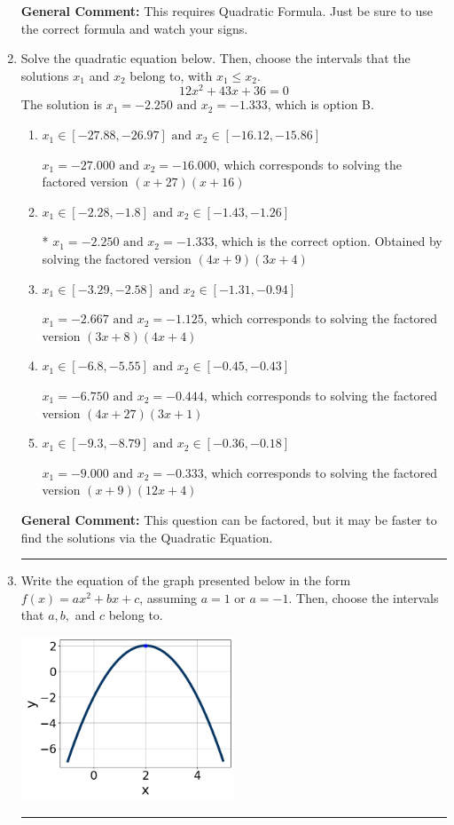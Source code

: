 \documentclass{extbook}[14pt]
\newcommand{\litem}[1]{\item #1

\rule{\textwidth}{0.4pt}}
\begin{document}
\begin{enumerate}
{\textbf{General Comment:} This requires Quadratic Formula. Just be sure to use the correct formula and watch your signs.
}
\litem{
Solve the quadratic equation below. Then, choose the intervals that the solutions $x_1$ and $x_2$ belong to, with $x_1 \leq x_2$.
\[ 12x^{2} +43 x + 36 = 0 \]The solution is \( x_1 = -2.250 \text{ and } x_2 = -1.333 \), which is option B.\begin{enumerate}[label=\Alph*.]
\item \( x_1 \in [-27.88, -26.97] \text{ and } x_2 \in [-16.12, -15.86] \)

$x_1 = -27.000 \text{ and } x_2 = -16.000$, which corresponds to solving the factored version $(x + 27)(x + 16)$
\item \( x_1 \in [-2.28, -1.8] \text{ and } x_2 \in [-1.43, -1.26] \)

* $x_1 = -2.250 \text{ and } x_2 = -1.333$, which is the correct option. Obtained by solving the factored version $(4x + 9)(3x + 4)$
\item \( x_1 \in [-3.29, -2.58] \text{ and } x_2 \in [-1.31, -0.94] \)

$x_1 = -2.667 \text{ and } x_2 = -1.125$, which corresponds to solving the factored version $(3x + 8)(4x + 4)$
\item \( x_1 \in [-6.8, -5.55] \text{ and } x_2 \in [-0.45, -0.43] \)

$x_1 = -6.750 \text{ and } x_2 = -0.444$, which corresponds to solving the factored version $(4x + 27)(3x + 1)$
\item \( x_1 \in [-9.3, -8.79] \text{ and } x_2 \in [-0.36, -0.18] \)

$x_1 = -9.000 \text{ and } x_2 = -0.333$, which corresponds to solving the factored version $(x + 9)(12x + 4)$
\end{enumerate}

\textbf{General Comment:} This question can be factored, but it may be faster to find the solutions via the Quadratic Equation.
}
\litem{
Write the equation of the graph presented below in the form $f(x)=ax^2+bx+c$, assuming  $a=1$ or $a=-1$. Then, choose the intervals that $a, b,$ and $c$ belong to.

\begin{center}
    \includegraphics[width=0.5\textwidth]{../Figures/quadraticGraphToEquationA.png}
\end{center}


}
\end{enumerate}
\end{document}
